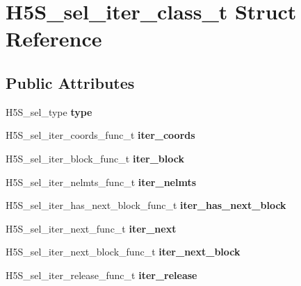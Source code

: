 \hypertarget{struct_h5_s__sel__iter__class__t}{}\section{H5\+S\+\_\+sel\+\_\+iter\+\_\+class\+\_\+t Struct Reference}
\label{struct_h5_s__sel__iter__class__t}
\subsection*{Public Attributes}
\begin{DoxyCompactItemize}
\item 
\mbox{\label{struct_h5_s__sel__iter__class__t_a56ef23d94174f32648aba7fafb0f643a}} 
H5\+S\+\_\+sel\+\_\+type {\bfseries type}
\item 
\mbox{\label{struct_h5_s__sel__iter__class__t_af5a2605d8756c4c00d7d7de4f2de11c6}} 
H5\+S\+\_\+sel\+\_\+iter\+\_\+coords\+\_\+func\+\_\+t {\bfseries iter\+\_\+coords}
\item 
\mbox{\label{struct_h5_s__sel__iter__class__t_a627587bcc6bda3697e06c53bab2c76b7}} 
H5\+S\+\_\+sel\+\_\+iter\+\_\+block\+\_\+func\+\_\+t {\bfseries iter\+\_\+block}
\item 
\mbox{\label{struct_h5_s__sel__iter__class__t_a7f2fb181d4c0beeeca7395de0fe248f7}} 
H5\+S\+\_\+sel\+\_\+iter\+\_\+nelmts\+\_\+func\+\_\+t {\bfseries iter\+\_\+nelmts}
\item 
\mbox{\label{struct_h5_s__sel__iter__class__t_a854a4a290c01b5c50a54091df59e82e5}} 
H5\+S\+\_\+sel\+\_\+iter\+\_\+has\+\_\+next\+\_\+block\+\_\+func\+\_\+t {\bfseries iter\+\_\+has\+\_\+next\+\_\+block}
\item 
\mbox{\label{struct_h5_s__sel__iter__class__t_a79d784f61d475d68f6eafcd4a83b1d1d}} 
H5\+S\+\_\+sel\+\_\+iter\+\_\+next\+\_\+func\+\_\+t {\bfseries iter\+\_\+next}
\item 
\mbox{\label{struct_h5_s__sel__iter__class__t_afb1a7773ce8b9b6156c8303e5603afe2}} 
H5\+S\+\_\+sel\+\_\+iter\+\_\+next\+\_\+block\+\_\+func\+\_\+t {\bfseries iter\+\_\+next\+\_\+block}
\item 
\mbox{\label{struct_h5_s__sel__iter__class__t_a732cedff70aff005ca6b37e955c8b790}} 
H5\+S\+\_\+sel\+\_\+iter\+\_\+release\+\_\+func\+\_\+t {\bfseries iter\+\_\+release}
\end{DoxyCompactItemize}



